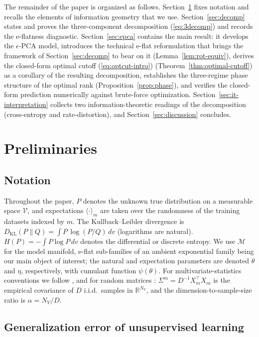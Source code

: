 \documentclass[11pt,a4paper]{article}
\theoremstyle{definition}
\theoremstyle{remark}
\newcommand{\KL}{D_{\mathrm{KL}}}
\newcommand{\R}{\mathbb{R}}
\newcommand{\PV}{P}
\newcommand{\NV}{N_V}
\newcommand{\Mfam}{\mathcal{M}}
\begin{document}
\medskip
The remainder of the paper is organized as follows.
Section~\ref{sec:prelim} fixes notation and recalls the elements
of information geometry that we use. Section~\ref{sec:decomp}
states and proves the three-component decomposition
(\ref{eq:3decomp}) and records the e-flatness diagnostic.
Section~\ref{sec:epca} contains the main result: it
develops the $\epsilon$-PCA model, introduces the technical
e-flat reformulation that brings the framework of
Section~\ref{sec:decomp} to bear on it
(Lemma~\ref{lem:rot-equiv}), derives the closed-form optimal
cutoff (\ref{eq:optcut-intro}) (Theorem~\ref{thm:optimal-cutoff})
as a corollary of the resulting decomposition, establishes the
three-regime phase structure of the optimal rank
(Proposition~\ref{prop:phase}), and verifies the closed-form
prediction numerically against brute-force optimization. Section~\ref{sec:it-interpretation}
collects two information-theoretic readings of the
decomposition (cross-entropy and rate-distortion), and
Section~\ref{sec:discussion} concludes.

\section{Preliminaries}
\label{sec:prelim}

\subsection{Notation}
Throughout the paper, $\PV$ denotes the unknown true
distribution on a measurable space $\mathcal{V}$, and
expectations $\langle \cdot \rangle_{m}$ are taken over the
randomness of the training datasets indexed by $m$. The Kullback--Leibler divergence is
$\KL(P\|Q) = \int P\,\log(P/Q)\,dv$ (logarithms are natural).
$H(P) = -\int P\log P\,dv$ denotes the differential or discrete
entropy. We use $\Mfam$ for the model manifold, e-flat sub-families
of an ambient exponential family being our main object of interest;
the natural and expectation parameters are denoted $\theta$ and
$\eta$, respectively, with cumulant function $\psi(\theta)$. For
multivariate-statistics conventions we follow
\cite{Anderson2003}, and for random matrices
\cite{BaiSilverstein2010}:
$\Sigma^{m} = D^{-1} X_m^{\top}X_m$ is the empirical covariance of
$D$ i.i.d.\ samples in $\R^{\NV}$, and the dimension-to-sample-size
ratio is $\alpha = \NV/D$.

\subsection{Generalization error of unsupervised learning}
\end{document}
